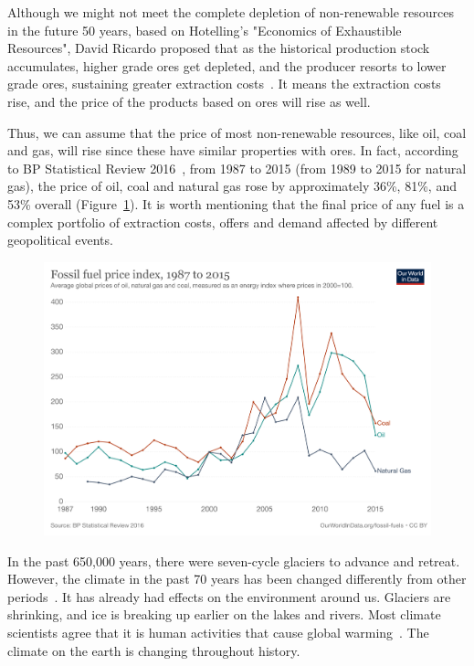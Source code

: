 Although we might not meet the complete depletion of non-renewable resources in the future 50 years, based on Hotelling’s "Economics of Exhaustible Resources", David Ricardo proposed that as the historical production stock accumulates, higher grade ores get depleted, and the producer resorts to lower grade ores, sustaining greater extraction costs~\cite{devarajan1981hotelling}. It means the extraction costs rise, and the price of the products based on ores will rise as well. 


Thus, we can assume that the price of most non-renewable resources, like oil, coal and gas, will rise since these have similar properties with ores. In fact, according to BP Statistical Review 2016~\cite{BP2016bp}, from 1987 to 2015 (from 1989 to 2015 for natural gas), the price of oil, coal and natural gas rose by approximately 36\%, 81\%, and 53\% overall (Figure~\ref{intro_fossil-fuel-price-index}). It is worth mentioning that the final price of any fuel is a complex portfolio of extraction costs, offers and demand affected by different geopolitical events.


\begin{figure}[!t]
\center
\includegraphics[scale=0.12]{img/intro_fossil-fuel-price-index.png}
\label{intro_fossil-fuel-price-index} %
\end{figure} 


In the past 650,000 years, there were seven-cycle glaciers to advance and retreat. However, the climate in the past 70 years has been changed differently from other periods~\cite{parmesan2003globally}. It has already had effects on the environment around us. Glaciers are shrinking, and ice is breaking up earlier on the lakes and rivers. Most climate scientists agree that it is human activities that cause global warming~\cite{epic337530}. The climate on the earth is changing throughout history.\\


